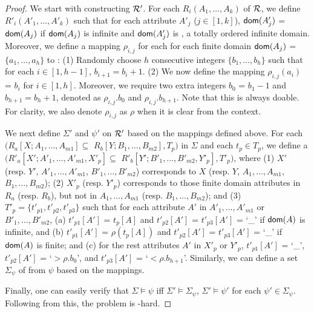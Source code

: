 {\begin{proof}
We start with constructing ${\cal R'}$. For each
$R_i(A_1,\ldots,A_k)$ of ${\cal R}$, we define
$R'_i(A'_1,\ldots,A'_k)$ such that for each attribute $A'_j$
($j\in[1, k]$), $\protect\mathsf{dom}(A'_j)$ = $\protect\mathsf{dom}(A_j)$ if $\protect\mathsf{dom}(A_j)$ is
infinite and $\protect\mathsf{dom}(A'_j)$ is , a totally ordered
infinite domain. Moreover, we define a mapping $\rho_{i,j}$  for
each for each finite domain $\protect\mathsf{dom}(A_j)$ = $\{a_1,\ldots,a_h\}$ to
: (1) Randomly choose $h$ consecutive integers $\{b_1,
\ldots, b_h\}$ such that for each $i\in[1, h-1]$, $b_{i+1} = b_i +
1$. (2) We now define the mapping $\rho_{i,j}(a_i)$ = $b_i$ for
$i\in[1, h]$. Moreover, we require two extra integers $b_0$ = $b_1 -
1$ and $b_{h+1} = b_h + 1$, denoted as $\rho_{i,j}.b_0$ and
$\rho_{i,j}.b_{h+1}$. Note that this is always doable. For clarity,
we also denote $\rho_{i,j}$ as $\rho$ when it is clear from the
context.

We next define  $\Sigma'$ and $\psi'$ on ${\cal R'}$ based on the
mappings defined above. For each \CIND $(R_a[X; A_1,\ldots,A_{m1}]
\subseteq$ $R_b[Y; B_1,\ldots,B_{m2}], T_p)$ in $\Sigma$ and each
$t_p\in T_p$, we define a \pCIND $(R'_a[X';
A'_1,\ldots,A'_{m1},X'_p] \subseteq$ $R'_b[Y';
B'_1,\ldots,B'_{m2},Y'_p], T'_p)$, where (1) $X'$ (resp. $Y'$,
$A'_1,\ldots,A'_{m1}$, $B'_1,\ldots,B'_{m2}$) corresponds to $X$
(resp. $Y$, $A_1,\ldots,A_{m1}$, $B_1,\ldots,B_{m2}$); (2) $X'_p$
(resp. $Y'_p$) corresponds to those finite domain attributes in
$R_a$ (resp. $R_b$), but not in $A_1,\ldots,A_{m1}$ (resp.
$B_1,\ldots,B_{m2}$); and (3) $T'_p = \{t'_{p1},t'_{p2},t'_{p3}\}$
such that for each attribute $A'$ in $A'_1,\ldots,A'_{m1}$ or
$B'_1,\ldots,B'_{m2}$, (a) $t'_{p1}[A']$ = $t_p[A]$ and
$t'_{p2}[A']$ = $t'_{p3}[A']$ = `\_' if $\protect\mathsf{dom}(A)$ is infinite, and
(b) $t'_{p1}[A']$ = $\rho(t_p[A])$ and $t'_{p2}[A']$ = $t'_{p3}[A']$
= `\_' if $\protect\mathsf{dom}(A)$ is finite; and (c) for the rest attributes $A'$
in $X'_p$ or $Y'_p$, $t'_{p1}[A']$ = `\_', $t'_{p2}[A']$ =
`$>\rho.b_0$', and $t'_{p3}[A']$ = `$<\rho.b_{h+1}$'. Similarly, we
can define a set $\Sigma_{\psi}$ of \pCINDs from $\psi$ based on the
mappings.

Finally, one can easily verify that $\Sigma\models\psi$ iff
$\Sigma'\models\Sigma_{\psi}$, \ie $\Sigma'\models\psi'$ for each
\pCIND $\psi'\in\Sigma_{\psi}$. Following from this, the problem is
\EXPTIME-hard. \eop
\end{proof}
}%

